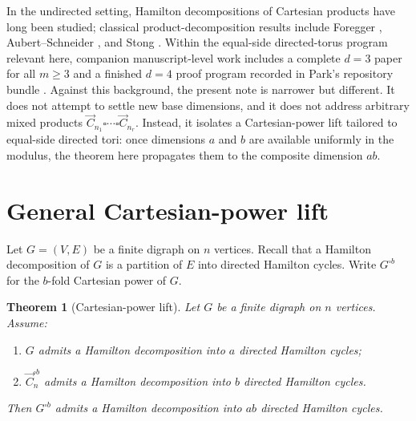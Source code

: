 \documentclass[11pt]{article}
\newtheorem{theorem}{Theorem}
\theoremstyle{remark}
\begin{document}
In the undirected setting, Hamilton decompositions of Cartesian products have long been studied; classical product-decomposition results include Foregger \cite{Foregger1978}, Aubert--Schneider \cite{AubertSchneider1982}, and Stong \cite{Stong1991}.
Within the equal-side directed-torus program relevant here, companion manuscript-level work includes a complete $d=3$ paper for all $m\ge 3$ and a finished $d=4$ proof program recorded in Park's repository bundle \cite{ParkD3,ParkRepo2026}.
Against this background, the present note is narrower but different.
It does not attempt to settle new base dimensions, and it does not address arbitrary mixed products $\vec C_{n_1}\square\cdots\square\vec C_{n_r}$.
Instead, it isolates a Cartesian-power lift tailored to equal-side directed tori: once dimensions $a$ and $b$ are available uniformly in the modulus, the theorem here propagates them to the composite dimension $ab$.

\section{General Cartesian-power lift}

Let $G=(V,E)$ be a finite digraph on $n$ vertices.
Recall that a Hamilton decomposition of $G$ is a partition of $E$ into directed Hamilton cycles.
Write $G^{\square b}$ for the $b$-fold Cartesian power of $G$.

\begin{theorem}[Cartesian-power lift]\label{thm:product}
Let $G$ be a finite digraph on $n$ vertices.
Assume:
\begin{enumerate}
    \item $G$ admits a Hamilton decomposition into $a$ directed Hamilton cycles;
    \item $\vec C_n^{\square b}$ admits a Hamilton decomposition into $b$ directed Hamilton cycles.
\end{enumerate}
Then $G^{\square b}$ admits a Hamilton decomposition into $ab$ directed Hamilton cycles.
\end{theorem}
\end{document}
